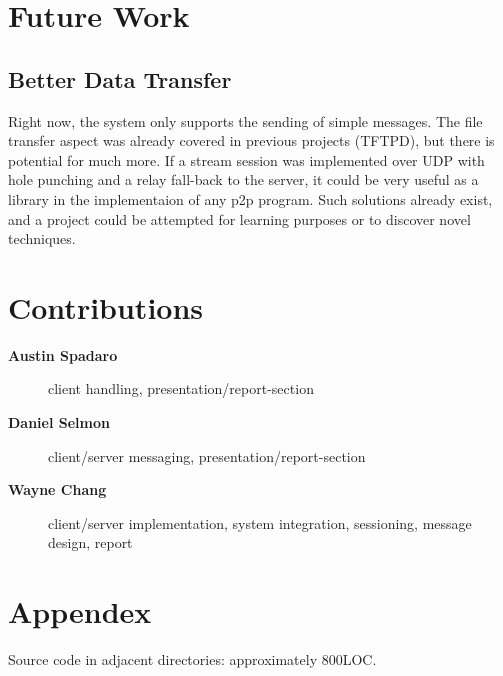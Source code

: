\documentclass{article}
\begin{document}
\section{Future Work}
\subsection{Better Data Transfer}
Right now, the system only supports the sending of simple messages. The file transfer aspect was already covered in previous projects (TFTPD), but there is potential for much more. If a stream session was implemented over UDP with hole punching and a relay fall-back to the server, it could be very useful as a library in the implementaion of any p2p program. Such solutions already exist, and a project could be attempted for learning purposes or to discover novel techniques.

\section{Contributions}
\begin{description}
	\item[\textbf{Austin Spadaro}] client handling, presentation/report-section
	\item[\textbf{Daniel Selmon}] client/server messaging, presentation/report-section
	\item[\textbf{Wayne Chang}] client/server implementation, system integration, sessioning, message design, report
\end{description}

\section{Appendex}
Source code in adjacent directories: approximately 800LOC.



\end{document}
